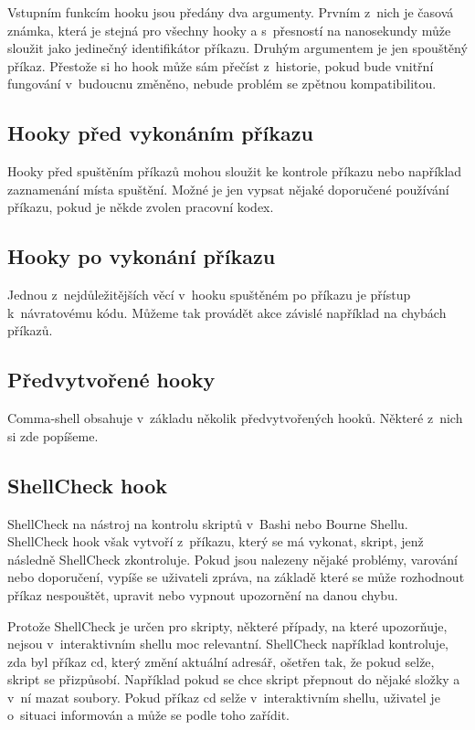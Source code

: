 \documentclass[thesis=M,czech]{FITthesis}[2012/06/26]
\begin{document}
Vstupním funkcím hooku jsou předány dva argumenty. Prvním z~nich je časová známka, která je stejná pro všechny hooky a s~přesností na nanosekundy může sloužit jako jedinečný identifikátor příkazu. Druhým argumentem je jen spouštěný příkaz. Přestože si ho hook může sám přečíst z~historie, pokud bude vnitřní fungování v~budoucnu změněno, nebude problém se zpětnou kompatibilitou.

\subsection{Hooky před vykonáním příkazu}

Hooky před spuštěním příkazů mohou sloužit ke kontrole příkazu nebo například zaznamenání místa spuštění. Možné je jen vypsat nějaké doporučené používání příkazu, pokud je někde zvolen pracovní kodex.

\subsection{Hooky po vykonání příkazu}

Jednou z~nejdůležitějších věcí v~hooku spuštěném po příkazu je přístup k~návratovému kódu. Můžeme tak provádět akce závislé například na chybách příkazů.

\subsection{Předvytvořené hooky}

Comma-shell obsahuje v~základu několik předvytvořených hooků. Některé z~nich si zde popíšeme.


%
\subsection{ShellCheck hook}

ShellCheck na nástroj na kontrolu skriptů v~Bashi nebo Bourne Shellu. ShellCheck hook však vytvoří z~příkazu, který se má vykonat, skript, jenž následně ShellCheck zkontroluje. Pokud jsou nalezeny nějaké problémy, varování nebo doporučení, vypíše se uživateli zpráva, na základě které se může rozhodnout příkaz nespouštět, upravit nebo vypnout upozornění na danou chybu.

Protože ShellCheck je určen pro skripty, některé případy, na které upozorňuje, nejsou v~interaktivním shellu moc relevantní. ShellCheck například kontroluje, zda byl příkaz cd, který změní aktuální adresář, ošetřen tak, že pokud selže, skript se přizpůsobí. Například pokud se chce skript přepnout do nějaké složky a v~ní mazat soubory. Pokud příkaz cd selže v~interaktivním shellu, uživatel je o~situaci informován a může se podle toho zařídit.
\end{document}
